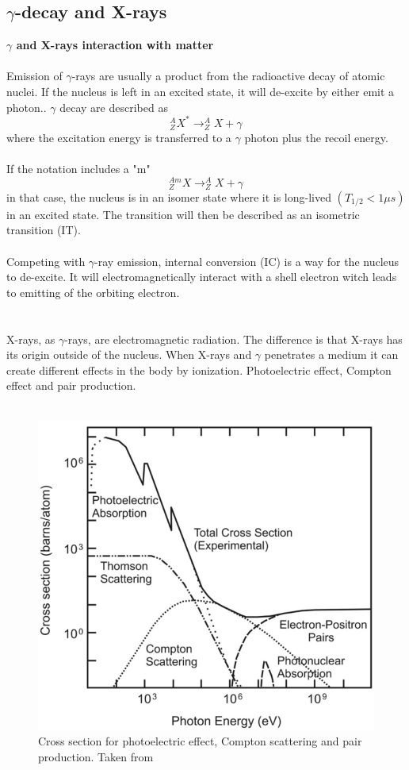 \documentclass[twoside,english]{uiofysmaster/uiofysmaster}
\begin{document}
\subsection{$\gamma$-decay and X-rays}

\textbf{$\gamma$ and X-rays interaction with matter}\\
\\
\noindent
Emission of $\gamma$-rays are usually a product from the radioactive decay of atomic nuclei. If the nucleus is left in an excited state, it will de-excite by either emit a photon.\cite{nuclearchem}. $\gamma$ decay are described as $$^{A}_{Z}X^* \rightarrow ^{A}_ZX + \gamma$$
where the excitation energy is transferred to a $\gamma$ photon plus the recoil energy.\\
\\
If the notation includes a "m" $$^{Am}_ZX \rightarrow^{A}_ZX + \gamma$$
in that case, the nucleus is in an isomer state where it is long-lived $(T_{1/2} < 1 \mu s)$ in an excited state\cite{nuclearchem}. The transition will then be described as an isometric transition (IT).\\
\\
Competing with $\gamma$-ray emission, internal conversion (IC) is a way for the nucleus to de-excite. It will electromagnetically interact with a shell electron witch leads to emitting of the orbiting electron\cite{toxicology}.\\
\\
\\  
X-rays, as $\gamma$-rays, are electromagnetic radiation. The difference is that X-rays has its origin outside of the nucleus. When X-rays and $\gamma$ penetrates a medium it can create different effects in the body by ionization.
Photoelectric effect, Compton effect and pair production. \\
\\
\begin{figure}[h!]
    \centering
     \includegraphics[scale=0.4]{pcp_cross.png}
     \caption{Cross section for photoelectric effect, Compton scattering and pair production. Taken from \cite{photoelectric_cross} }
    \label{fig:photo-compton-pair}
\end{figure}
\end{document}
